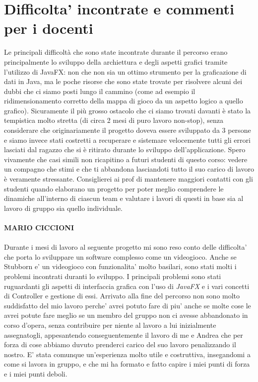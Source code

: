 \documentclass[a4paper,12pt]{report}
\begin{document}
\section{Difficolta' incontrate e commenti per i docenti}
Le principali difficoltà che sono state incontrate durante il percorso erano principalmente lo sviluppo della archiettura e degli aspetti grafici tramite l'utilizzo di JavaFX: non che non sia un ottimo strumento per la graficazione di dati in Java, ma le poche risorse che sono state trovate per risolvere alcuni dei dubbi che ci siamo posti lungo il cammino (come ad esempio il ridimensionamento corretto della mappa di gioco da un aspetto logico a quello grafico). Sicuramente il più grosso ostacolo che ci siamo trovati davanti è stato la tempistica molto stretta (di circa 2 mesi di puro lavoro non-stop), senza considerare che originariamente il progetto doveva essere sviluppato da 3 persone e siamo invece stati costretti a recuperare e sistemare velocemente tutti gli errori lasciati dal ragazzo che si è ritirato durante lo sviluppo dell'applicazione. Spero vivamente che casi simili non ricapitino a futuri studenti di questo corso: vedere un compagno che stimi e che ti abbandona lasciandoti tutto il suo carico di lavoro è veramente stressante. Consiglierei ai prof di mantenere maggiori contatti con gli studenti quando elaborano un progetto per poter meglio comprendere le dinamiche all'interno di ciascun team e valutare i lavori di questi in base sia al lavoro di gruppo sia quello individuale.
\\ \\
\textbf{MARIO CICCIONI}
\\ \\
Durante i mesi di lavoro al seguente progetto mi sono reso conto delle difficolta' che porta lo sviluppare un software complesso come un videogioco. Anche se Stubborn e' un videogioco con funzionalita' molto basilari, sono stati molti i problemi incontrati duranti lo sviluppo. I principali problemi sono stati ruguardanti gli aspetti di interfaccia grafica con l'uso di \textit{JavaFX} e i vari concetti di Controller e gestione di essi. Arrivato alla fine del percorso non sono molto suddisfatto del mio lavoro perche' avrei potuto fare di piu' anche se molte cose le avrei potute fare meglio se un membro del gruppo non ci avesse abbandonato in corso d'opera, senza contribuire per niente al lavoro a lui inizialmente assegnatogli, appesantendo conseguentemente il lavoro di me e Andrea che per forza di cose abbiamo duvuto prenderci carico del suo lavoro penalizzando il nostro. E' stata comunque un'esperienza molto utile e costruttiva, insegandomi a come si lavora in gruppo, e che mi ha formato e fatto capire i miei punti di forza e i miei punti deboli.  
\appendix
\end{document}
